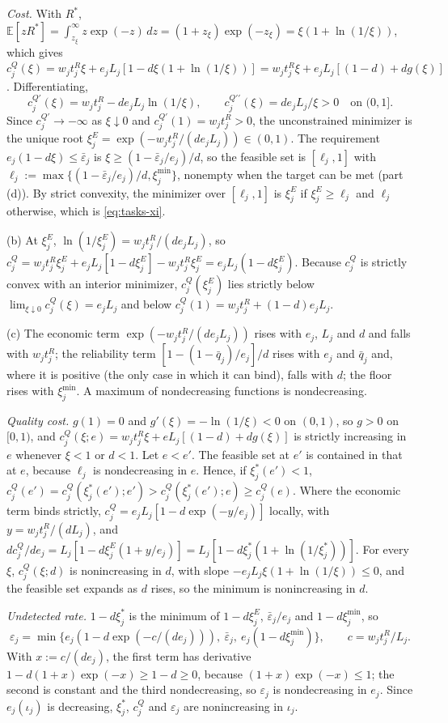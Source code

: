 \emph{Cost.} With $R^*$, $\mathbb E[zR^*]=\int_{z_\xi}^\infty z\exp(-z)\,dz=(1+z_\xi)\exp(-z_\xi)=\xi(1+\ln(1/\xi))$, which gives $c^Q_j(\xi)=w_jt^R_j\xi+e_jL_j[1-d\xi(1+\ln(1/\xi))]=w_jt^R_j\xi+e_jL_j[(1-d)+dg(\xi)]$. Differentiating,
\[
c^{Q\prime}_j(\xi)=w_jt^R_j-de_jL_j\ln(1/\xi),\qquad c^{Q\prime\prime}_j(\xi)=de_jL_j/\xi>0\quad\text{on }(0,1].
\] Since $c^{Q\prime}_j\to-\infty$ as $\xi\downarrow 0$ and $c^{Q\prime}_j(1)=w_jt^R_j>0$, the unconstrained minimizer is the unique root $\xi^E_j=\exp(-w_jt^R_j/(de_jL_j))\in(0,1)$. The requirement $e_j(1-d\xi)\le\bar\varepsilon_j$ is $\xi\ge(1-\bar\varepsilon_j/e_j)/d$, so the feasible set is $[\ell_j,1]$ with $\ell_j:=\max\{(1-\bar\varepsilon_j/e_j)/d,\xi^{\min}_j\}$, nonempty when the target can be met (part (d)). By strict convexity, the minimizer over $[\ell_j,1]$ is $\xi^E_j$ if $\xi^E_j\ge\ell_j$ and $\ell_j$ otherwise, which is \eqref{eq:tasks-xi}.

(b) At $\xi^E_j$, $\ln(1/\xi^E_j)=w_jt^R_j/(de_jL_j)$, so $c^Q_j=w_jt^R_j\xi^E_j+e_jL_j[1-d\xi^E_j]-w_jt^R_j\xi^E_j=e_jL_j(1-d\xi^E_j)$. Because $c^Q_j$ is strictly convex with an interior minimizer, $c^Q_j(\xi^E_j)$ lies strictly below $\lim_{\xi\downarrow 0}c^Q_j(\xi)=e_jL_j$ and below $c^Q_j(1)=w_jt^R_j+(1-d)e_jL_j$.

(c) The economic term $\exp(-w_jt^R_j/(de_jL_j))$ rises with $e_j$, $L_j$ and $d$ and falls with $w_jt^R_j$; the reliability term $[1-(1-\bar q_j)/e_j]/d$ rises with $e_j$ and $\bar q_j$ and, where it is positive (the only case in which it can bind), falls with $d$; the floor rises with $\xi^{\min}_j$. A maximum of nondecreasing functions is nondecreasing.

\emph{Quality cost.} $g(1)=0$ and $g'(\xi)=-\ln(1/\xi)<0$ on $(0,1)$, so $g>0$ on $[0,1)$, and $c^Q_j(\xi;e)=w_jt^R_j\xi+e L_j[(1-d)+dg(\xi)]$ is strictly increasing in $e$ whenever $\xi<1$ or $d<1$. Let $e<e'$. The feasible set at $e'$ is contained in that at $e$, because $\ell_j$ is nondecreasing in $e$. Hence, if $\xi^*_j(e')<1$, $c^Q_j(e')=c^Q_j(\xi^*_j(e');e')>c^Q_j(\xi^*_j(e');e)\ge c^Q_j(e)$. Where the economic term binds strictly, $c^Q_j=e_jL_j[1-d\exp(-y/e_j)]$ locally, with $y=w_jt^R_j/(dL_j)$, and $dc^Q_j/de_j=L_j[1-d\xi^E_j(1+y/e_j)]=L_j[1-d\xi^*_j(1+\ln(1/\xi^*_j))]$. For every $\xi$, $c^Q_j(\xi;d)$ is nonincreasing in $d$, with slope $-e_jL_j\xi(1+\ln(1/\xi))\le 0$, and the feasible set expands as $d$ rises, so the minimum is nonincreasing in $d$.

\emph{Undetected rate.} $1-d\xi^*_j$ is the minimum of $1-d\xi^E_j$, $\bar\varepsilon_j/e_j$ and $1-d\xi^{\min}_j$, so
\[
\varepsilon_j=\min\bigl\{e_j(1-d\exp(-c/(de_j))),\ \bar\varepsilon_j,\ e_j(1-d\xi^{\min}_j)\bigr\},\qquad c=w_jt^R_j/L_j.
\] With $x:=c/(de_j)$, the first term has derivative $1-d(1+x)\exp(-x)\ge 1-d\ge 0$, because $(1+x)\exp(-x)\le 1$; the second is constant and the third nondecreasing, so $\varepsilon_j$ is nondecreasing in $e_j$. Since $e_j(\iota_j)$ is decreasing, $\xi^*_j$, $c^Q_j$ and $\varepsilon_j$ are nonincreasing in $\iota_j$.

